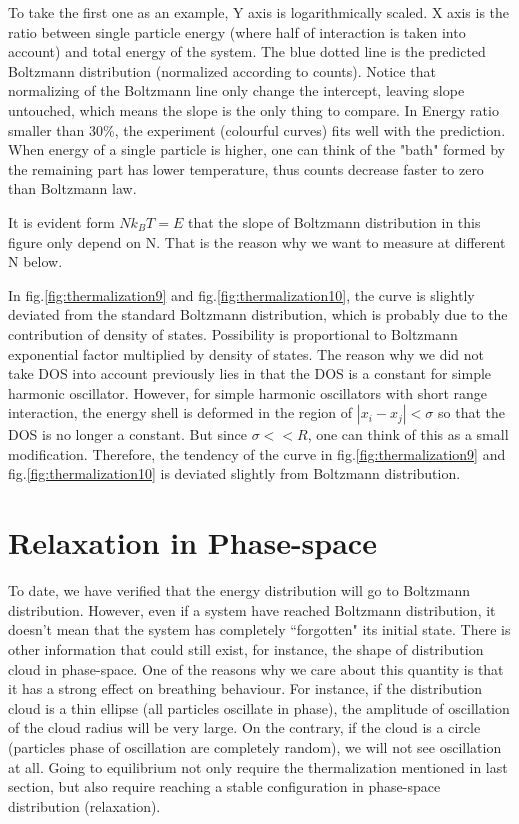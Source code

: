\documentclass[aps,pre,twocolumn
,groupedaddress]{revtex4-1}
\begin{document}
\newpage
\begin{flushleft}
To take the first one as an example, Y axis is logarithmically scaled. X axis is the ratio between single particle energy (where half of interaction is taken into account) and total energy of the system. The blue dotted line is the predicted Boltzmann distribution (normalized according to counts). Notice that normalizing of the Boltzmann line only change the intercept, leaving slope untouched, which means the slope is the only thing to compare. In  Energy ratio smaller than 30\%, the experiment (colourful curves) fits well with the prediction. When energy of a single particle is higher, one can think of the "bath" formed by the remaining part has lower temperature, thus counts decrease faster to zero than Boltzmann law.

It is evident form $Nk_BT=E$ that the slope of Boltzmann distribution in this figure only depend on N. That is the reason why we want to measure at different N below. 

In fig.\ref{fig:thermalization9} and fig.\ref{fig:thermalization10}, the curve is slightly deviated from the standard Boltzmann distribution, which is probably due to the contribution of density of states. Possibility is proportional to Boltzmann exponential factor multiplied by density of states. The reason why we did not take DOS into account previously lies in that the DOS is a constant for simple harmonic oscillator. However, for simple harmonic oscillators with short range interaction, the energy shell is deformed in the region of $|x_i-x_j|<\sigma$ so that the DOS is no longer a constant. But since $\sigma<<R$, one can think of this as a small modification. Therefore, the tendency of the curve in fig.\ref{fig:thermalization9} and fig.\ref{fig:thermalization10} is deviated slightly from Boltzmann distribution.
 
\end{flushleft}



\newpage
\section{Relaxation in Phase-space}
To date, we have verified that the energy distribution will go to Boltzmann distribution. However, even if a system have reached Boltzmann distribution, it doesn't mean that the system has completely ``forgotten" its initial state. There is other information that could still exist, for instance, the shape of distribution cloud in phase-space. One of the reasons why we care about this quantity is that it has a strong effect on breathing behaviour. For instance, if the distribution cloud is a thin ellipse (all particles oscillate in phase), the amplitude of oscillation of the cloud radius will be very large. On the contrary, if the cloud is a circle (particles phase of oscillation are completely random), we will not see oscillation at all. Going to equilibrium not only require the thermalization mentioned in last section, but also require reaching a stable configuration in phase-space distribution (relaxation).
\end{document}
